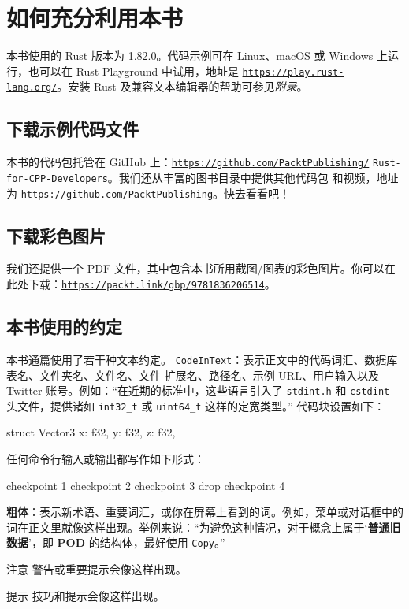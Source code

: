 \section{如何充分利用本书}
本书使用的 Rust 版本为 1.\allowbreak{}82.\allowbreak{}0。代码示例可在 Linux、macOS 或 Windows 上运行，也可以在 Rust Playground 中试用，地址是 \href{https://play.rust-lang.org/}{\texttt{https:/\allowbreak{}/\allowbreak{}play.\allowbreak{}rust-\allowbreak{}lang.\allowbreak{}org/\allowbreak{}}}。安装 Rust 及兼容文本编辑器的帮助可参见\emph{附录}。
\subsection{下载示例代码文件}
本书的代码包托管在 GitHub 上：\href{https://github.com/PacktPublishing/}{\texttt{https:/\allowbreak{}/\allowbreak{}github.\allowbreak{}com/\allowbreak{}PacktPublishing/\allowbreak{}}}
\texttt{Rust-\allowbreak{}for-\allowbreak{}CPP-\allowbreak{}Developers}。我们还从丰富的图书目录中提供其他代码包
和视频，地址为 \href{https://github.com/PacktPublishing}{\texttt{https:/\allowbreak{}/\allowbreak{}github.\allowbreak{}com/\allowbreak{}PacktPublishing}}。快去看看吧！
\subsection{下载彩色图片}
我们还提供一个 PDF 文件，其中包含本书所用截图/\allowbreak{}图表的彩色图片。你可以在此处下载：\href{https://packt.link/gbp/9781836206514}{\texttt{https:/\allowbreak{}/\allowbreak{}packt.\allowbreak{}link/\allowbreak{}gbp/\allowbreak{}9781836206514}}。
\subsection{本书使用的约定}
本书通篇使用了若干种文本约定。
\texttt{CodeInText}：表示正文中的代码词汇、数据库表名、文件夹名、文件名、文件
扩展名、路径名、示例 URL、用户输入以及 Twitter 账号。例如：“在近期的标准中，这些语言引入了 \texttt{stdint.h} 和 \texttt{cstdint} 头文件，提供诸如 \texttt{int32\_t} 或 \texttt{uint64\_t} 这样的定宽类型。”
代码块设置如下：
\begin{codebox}[rust]
struct Vector3 {
    x: f32,
    y: f32,
    z: f32,
}
\end{codebox}
任何命令行输入或输出都写作如下形式：
\begin{codeboxdark}
checkpoint 1
checkpoint 2
checkpoint 3
drop
checkpoint 4
\end{codeboxdark}
\textbf{粗体}：表示新术语、重要词汇，或你在屏幕上看到的词。例如，菜单或对话框中的词在正文里就像这样出现。举例来说：“为避免这种情况，对于概念上属于‘\textbf{普通旧数据}’，即 \textbf{POD} 的结构体，最好使用 \texttt{Copy}。”
\begin{myNotic}{注意}
警告或重要提示会像这样出现。
\end{myNotic}
\begin{myTip}{提示}
技巧和提示会像这样出现。
\end{myTip}
